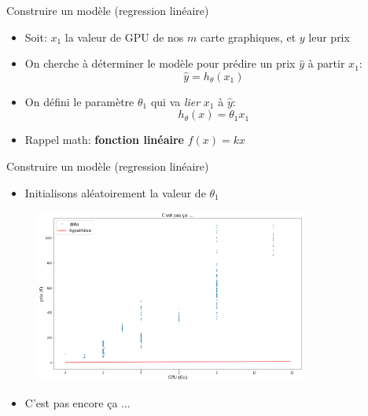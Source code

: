 \documentclass[11pt]{beamer}
\begin{document}
\begin{frame}{Construire un modèle (regression linéaire)}
  \begin{itemize}
  \item Soit: $x_{1}$ la valeur de GPU de nos $m$ carte graphiques, et $y$ leur prix
    \vspace{0.2cm}
  \item On cherche à déterminer le modèle pour prédire un prix $\hat{y}$ à partir $x_{1}$:
    \begin{equation*}
      \hat{y} = h_{\theta}(x_{1})
    \end{equation*}
  \item On défini le paramètre $\theta_{1}$ qui va \textit{lier} $x_{1}$ à $\hat{y}$:
    \begin{equation*}
      h_{\theta}(x) = \theta_{1} x_{1}
    \end{equation*}
  \item Rappel math: \textbf{fonction linéaire} $f(x) = kx$
  \end{itemize}
\end{frame}

\begin{frame}{Construire un modèle (regression linéaire)}
  \begin{itemize}
  \item Initialisons aléatoirement la valeur de $\theta_{1}$
  \end{itemize}
  \vspace{-0.5cm}
  \begin{figure}
    \includegraphics[width=0.8\textwidth]{figs/model.png}
  \end{figure}
  \vspace{-0.5cm}
  \begin{itemize}
  \item C'est pas encore ça ...
  \end{itemize}
\end{frame}
\end{document}
